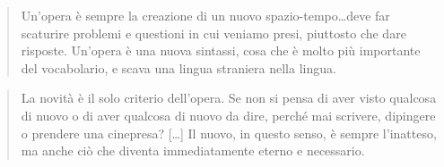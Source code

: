 \documentclass{../../lib/gs}
\begin{document}
\begin{quote}
\begin{sf}
\small
  Un'opera è sempre la creazione di un nuovo spazio-tempo\ldots deve far scaturire
  problemi e questioni in cui veniamo presi, piuttosto che dare risposte. Un'opera
  è una nuova sintassi, cosa che è molto più importante del vocabolario, e scava
  una lingua straniera nella lingua.
  \cite{deleuze2009}
  \end{sf}
\end{quote}

\begin{quote}
\begin{sf}
\small
  La novità è il solo criterio dell'opera. Se non si pensa di aver visto
  qualcosa di nuovo o di aver qualcosa di nuovo da dire, perché mai scrivere,
  dipingere o prendere una cinepresa? [\ldots] Il nuovo, in questo senso, è
  sempre l'inatteso, ma anche ciò che diventa immediatamente eterno e necessario.

  \cite{deleuze2009}
  \end{sf}
\end{quote}



%
%
%
%
%
%
%
%
\clearpage
\end{document}

